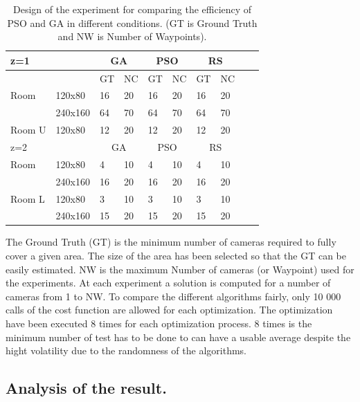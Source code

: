 \begin{table} [!htb]
\begin{tabular}{|l|l|l|l|l|l|l|l|l|l|}
  \hline
  \multicolumn{2}{|l|}{z=1 } &\multicolumn{2}{|c|}{GA}  & \multicolumn{2}{|c|}{PSO} & \multicolumn{2}{|c|}{RS}  \\  \hline
  \multicolumn{2}{|c|}{ } & GT & NC & GT & NC & GT & NC\\ \hline
  Room &  120x80 & 16 &20 & 16 & 20 & 16 & 20\\ \cline{2-8}
     &  240x160 & 64 &70 & 64 & 70 & 64 & 70 \\ \hline
  Room U &  120x80 & 12 &20 & 12 & 20 & 12 & 20\\ \hline
  \multicolumn{2}{|l|}{z=2 } &\multicolumn{2}{|c|}{GA}  & \multicolumn{2}{|c|}{PSO}& \multicolumn{2}{|c|}{RS}  \\  \hline
 Room &  120x80 & 4 &10 & 4 & 10 & 4 & 10\\ \cline{2-8}
     &  240x160 & 16 &20 & 16 & 20 & 16 & 20 \\ \hline
 Room L&  120x80 & 3 &10 & 3 & 10 & 3 & 10\\ \cline{2-8}
     &  240x160 & 15 &20 & 15 & 20 & 15 & 20 \\ \hline
  
\end{tabular}
\caption{Design of the experiment for comparing the efficiency of PSO and GA in different conditions.  (GT is Ground Truth and NW is Number of Waypoints).}\label{table:table1}

\end{table}

The Ground Truth (GT) is the minimum number of cameras required to fully cover a given area. The size of the area has been selected so that the GT can be easily estimated. 
NW is the maximum Number of cameras (or Waypoint) used for the experiments.  
At each experiment a solution is computed for a number of cameras from 1 to NW. To compare the different algorithms fairly, only 10 000 calls of the cost function are allowed for each optimization.
The optimization have been executed 8 times for each optimization process. 8 times is the minimum number of test has to be done to can have a usable average despite the hight volatility due to the randomness of the algorithms.\\ %


\subsection{ Analysis of the result.}

